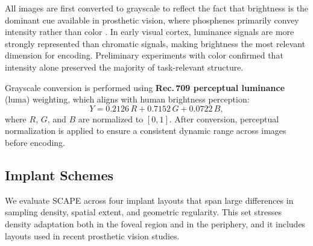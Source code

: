 All images are first converted to grayscale to reflect the fact that brightness is the dominant cue available in prosthetic vision, where phosphenes primarily convey intensity rather than color \cite{Wang2015}.  
In early visual cortex, luminance signals are more strongly represented than chromatic signals, making brightness the most relevant dimension for encoding.  
Preliminary experiments with color confirmed that intensity alone preserved the majority of task-relevant structure.

Grayscale conversion is performed using \textbf{Rec.\,709 perceptual luminance} (luma) weighting, which aligns with human brightness perception:
\begin{equation}
Y = 0.2126\,R + 0.7152\,G + 0.0722\,B,
\end{equation}
where $R$, $G$, and $B$ are normalized to $[0,1]$.  
After conversion, perceptual normalization is applied to ensure a consistent dynamic range across images before encoding.

\begin{table}[ht!]
\centering
{}
\vspace{1em}
\caption{Implant layouts and basic properties. Counts reflect the effective number of electrodes inside the simulator field of view. Eccentricity is reported in degrees of visual angle.}
\label{tab:implant_schemes}
\end{table}


\subsection{Implant Schemes}
We evaluate SCAPE across four implant layouts that span large differences in sampling density, spatial extent, and geometric regularity. This set stresses density adaptation both in the foveal region and in the periphery, and it includes layouts used in recent prosthetic vision studies.


